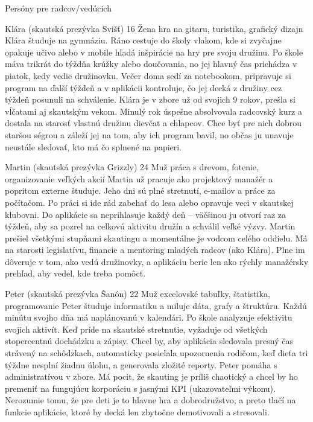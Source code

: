Persóny pre radcov/vedúcich

{Klára (skautská prezývka Svišť)}
{16}
{Žena}
{hra na gitaru, turistika, grafický dizajn}
{Klára študuje na gymnáziu. Ráno cestuje do školy vlakom, kde si zvyčajne opakuje učivo alebo v mobile hľadá inšpirácie na hry pre svoju družinu. Po škole máva trikrát do týždňa krúžky alebo doučovania, no jej hlavný čas prichádza v piatok, kedy vedie družinovku. Večer doma sedí za notebookom, pripravuje si program na ďalší týždeň a v aplikácii kontroluje, čo jej decká z družiny cez týždeň posunuli na schválenie.}
{Klára je v zbore už od svojich 9 rokov, prešla si vĺčatami aj skautským vekom. Minulý rok úspešne absolvovala radcovský kurz a dostala na starosť vlastnú družinu dievčat a chlapcov. Chce byť pre nich dobrou staršou ségrou a záleží jej na tom, aby ich program bavil, no občas ju unavuje neustále sledovať, kto má čo splnené na papieri.}

{Martin (skautská prezývka Grizzly)}
{24}
{Muž}
{práca s drevom, fotenie, organizovanie veľkých akcií}
{Martin už pracuje ako projektový manažér a popritom externe študuje. Jeho dni sú plné stretnutí, e-mailov a práce za počítačom. Po práci si ide rád zabehať do lesa alebo opravuje veci v skautskej klubovni. Do aplikácie sa neprihlasuje každý deň – väčšinou ju otvorí raz za týždeň, aby sa pozrel na celkovú aktivitu družín a schválil veľké výzvy.}
{Martin prešiel všetkými stupňami skautingu a momentálne je vodcom celého oddielu. Má na starosti legislatívu, financie a mentoring mladých radcov (ako Klára). Plne im dôveruje v tom, ako vedú družinovky, a aplikáciu berie len ako rýchly manažérsky prehľad, aby vedel, kde treba pomôcť.}

{Peter (skautská prezývka Šanón)}
{22}
{Muž}
{excelovské tabuľky, štatistika, programovanie}
{Peter študuje informatiku a miluje dáta, grafy a štruktúru. Každú minútu svojho dňa má naplánovanú v kalendári. Po škole analyzuje efektivitu svojich aktivít. Keď príde na skautské stretnutie, vyžaduje od všetkých stopercentnú dochádzku a zápisy. Chcel by, aby aplikácia sledovala presný čas strávený na schôdzkach, automaticky posielala upozornenia rodičom, keď dieťa tri týždne nesplní žiadnu úlohu, a generovala zložité reporty.}
{Peter pomáha s administratívou v zbore. Má pocit, že skauting je príliš chaotický a chcel by ho premeniť na fungujúcu korporáciu s jasnými KPI (ukazovateľmi výkonu). Nerozumie tomu, že pre deti je to hlavne hra a dobrodružstvo, a preto tlačí na funkcie aplikácie, ktoré by decká len zbytočne demotivovali a stresovali.}

